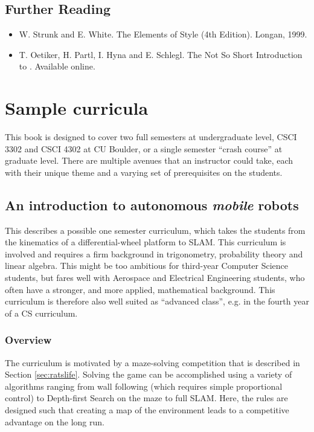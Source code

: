\documentclass[paper=6.14in:9.21in,pagesize=pdftex,11pt,twoside,openright]{scrbook}
\begin{document}
\section*{Further Reading}

\begin{itemize}
\item W. Strunk and E. White. The Elements of Style (4th Edition). Longan, 1999.
\item T. Oetiker, H. Partl, I. Hyna and E. Schlegl. The Not So Short Introduction to \LaTeXe. Available online.
\end{itemize}

\chapter{Sample curricula}

This book is designed to cover two full semesters at undergraduate level, CSCI 3302 and CSCI 4302 at CU Boulder, or a single semester ``crash course'' at graduate level. There are multiple avenues that an instructor could take, each with their unique theme and a varying set of prerequisites on the students. 
 

\section{An introduction to autonomous \emph{mobile} robots}
This describes a possible one semester curriculum, which takes the students from the kinematics of a differential-wheel platform to SLAM. This curriculum is involved and requires a firm background in trigonometry, probability theory and linear algebra. This might be too ambitious for third-year Computer Science students, but fares well with Aerospace and Electrical Engineering students, who often have a stronger, and more applied, mathematical background. This curriculum is therefore also well suited as ``advanced class'', e.g. in the fourth year of a CS curriculum.

\subsection{Overview}
The curriculum is motivated by a maze-solving competition that is described in Section \ref{sec:ratslife}. Solving the game can be accomplished using a variety of algorithms ranging from wall following (which requires simple proportional control) to Depth-first Search on the maze to full SLAM. Here, the rules are designed such that creating a map of the environment leads to a competitive advantage on the long run.
\end{document}
